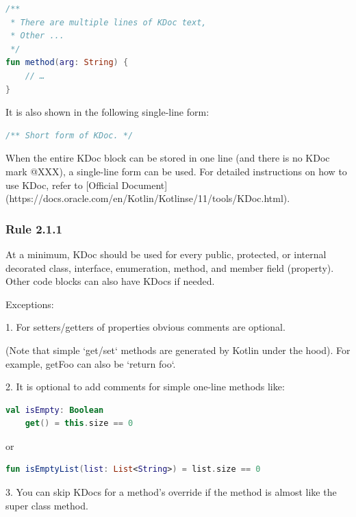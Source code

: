 \begin{lstlisting}[language=Kotlin]
 /**
 * There are multiple lines of KDoc text,
 * Other ...
 */
fun method(arg: String) {
    // …
}
\end{lstlisting}


It is also shown in the following single-line form:



\begin{lstlisting}[language=Kotlin]
 /** Short form of KDoc. */
\end{lstlisting}
When the entire KDoc block can be stored in one line (and there is no KDoc mark @XXX), a single-line form can be used. For detailed instructions on how to use KDoc, refer to [Official Document](https://docs.oracle.com/en/Kotlin/Kotlinse/11/tools/KDoc.html).



\subsubsection*{\textbf{Rule 2.1.1}}
\leavevmode\newline



At a minimum, KDoc should be used for every public, protected, or internal decorated class, interface, enumeration, method, and member field (property). Other code blocks can also have KDocs if needed.



Exceptions:



1. For setters/getters of properties obvious comments are optional.

 (Note that simple `get/set` methods are generated by Kotlin under the hood). For example, getFoo can also be `return foo`.

   

2. It is optional to add comments for simple one-line methods like:

\begin{lstlisting}[language=Kotlin]
val isEmpty: Boolean
    get() = this.size == 0
\end{lstlisting}


or



\begin{lstlisting}[language=Kotlin]
fun isEmptyList(list: List<String>) = list.size == 0
\end{lstlisting}


3. You can skip KDocs for a method's override if the method is almost like the super class method.



